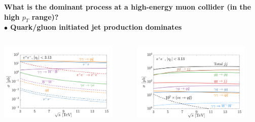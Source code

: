 \documentclass[aspectratio=169]{beamer}
\begin{document}
\begin{frame}
	\vspace{2mm}\hspace{3mm}\textcolor{PittRoyal}{\bf What is the dominant process at a high-energy muon collider (in the high $p_T$ range)? }\\
	\hspace{5mm}\textcolor{PittGold}{\bf $\bullet$ Quark/gluon initiated jet production dominates}
	\begin{columns}
		\begin{column}{0.42\textwidth}
		\includegraphics[width=0.88\textwidth]{figs/sigma_eeCollider_c5_3pt_s20}
		\end{column}
		\begin{column}{0.42\textwidth}
			\includegraphics[width=0.88\textwidth]{figs/dijjet_e_5d_3pt_s20}

\end{column}
\end{columns}
\end{frame}
\end{document}
